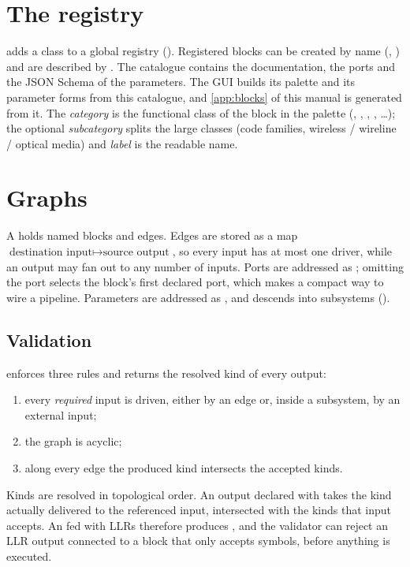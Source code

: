 \section{The registry}
 adds a class to a global registry
(). Registered blocks can be created by name (,
) and are described by . The catalogue contains
the documentation, the ports and the JSON Schema of the parameters. The GUI builds its palette
and its parameter forms from this catalogue, and \cref{app:blocks} of this manual is generated
from it. The \emph{category} is the functional class of the block in the palette (,
, , , \dots); the optional \emph{subcategory} splits the
large classes (code families, wireless / wireline / optical media) and \emph{label} is the readable name.

\section{Graphs}\label{sec:graphs}
A  holds named blocks and edges. Edges are stored as a map
$\text{destination input}\mapsto\text{source output}$, so every input has at most one driver,
while an output may fan out to any number of inputs. Ports are addressed as
; omitting the port selects the block's first declared port, which makes
 a compact way to wire a pipeline. Parameters are
addressed as , and  descends into subsystems
().

\subsection{Validation}\label{sec:validation}
 enforces three rules and returns the resolved kind of every output:
\begin{enumerate}
  \item every \emph{required} input is driven, either by an edge or, inside a subsystem, by an
  external input;
  \item the graph is acyclic;
  \item along every edge the produced kind intersects the accepted kinds.
\end{enumerate}
Kinds are resolved in topological order. An output declared with  takes the
kind actually delivered to the referenced input, intersected with the kinds that input accepts.
An  fed with LLRs therefore produces , and the validator can reject
an LLR output connected to a block that only accepts symbols, before anything is executed.

